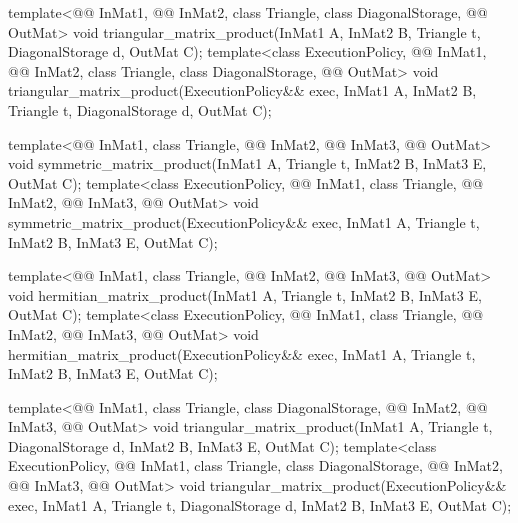 \begin{codeblock}
{  template<@@ InMat1, @@ InMat2, class Triangle, class DiagonalStorage,
           @@ OutMat>
    void triangular_matrix_product(InMat1 A, InMat2 B, Triangle t, DiagonalStorage d, OutMat C);
  template<class ExecutionPolicy,
           @@ InMat1, @@ InMat2, class Triangle, class DiagonalStorage,
           @@ OutMat>
    void triangular_matrix_product(ExecutionPolicy&& exec,
                                   InMat1 A, InMat2 B, Triangle t, DiagonalStorage d, OutMat C);

  template<@@ InMat1, class Triangle, @@ InMat2, @@ InMat3,
           @@ OutMat>
    void symmetric_matrix_product(InMat1 A, Triangle t, InMat2 B, InMat3 E, OutMat C);
  template<class ExecutionPolicy,
           @@ InMat1, class Triangle, @@ InMat2, @@ InMat3,
           @@ OutMat>
    void symmetric_matrix_product(ExecutionPolicy&& exec,
                                  InMat1 A, Triangle t, InMat2 B, InMat3 E, OutMat C);

  template<@@ InMat1, class Triangle, @@ InMat2, @@ InMat3,
           @@ OutMat>
    void hermitian_matrix_product(InMat1 A, Triangle t, InMat2 B, InMat3 E, OutMat C);
  template<class ExecutionPolicy,
           @@ InMat1, class Triangle, @@ InMat2, @@ InMat3,
           @@ OutMat>
    void hermitian_matrix_product(ExecutionPolicy&& exec,
                                  InMat1 A, Triangle t, InMat2 B, InMat3 E, OutMat C);

  template<@@ InMat1, class Triangle, class DiagonalStorage,
           @@ InMat2, @@ InMat3, @@ OutMat>
    void triangular_matrix_product(InMat1 A, Triangle t, DiagonalStorage d, InMat2 B, InMat3 E,
                                   OutMat C);
  template<class ExecutionPolicy,
           @@ InMat1, class Triangle, class DiagonalStorage,
           @@ InMat2, @@ InMat3, @@ OutMat>
    void triangular_matrix_product(ExecutionPolicy&& exec,
                                   InMat1 A, Triangle t, DiagonalStorage d, InMat2 B, InMat3 E,
                                   OutMat C);

}
\end{codeblock}
